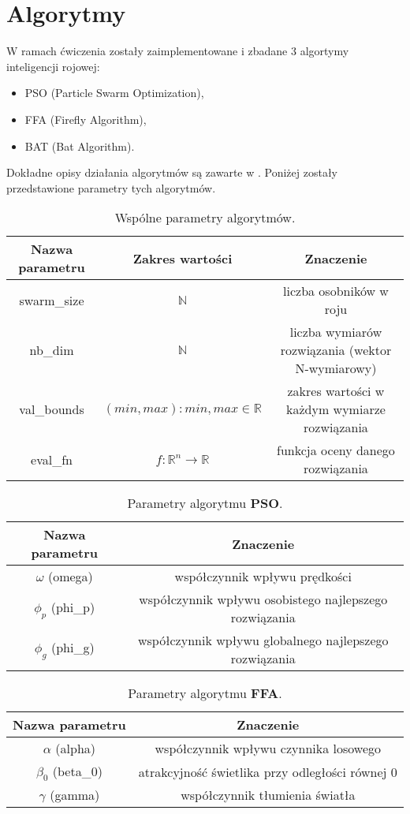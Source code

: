 \section{Algorytmy}
W ramach ćwiczenia zostały zaimplementowane i zbadane 3 algortymy inteligencji rojowej:
\begin{itemize}
  \item{PSO (Particle Swarm Optimization),}
  \item{FFA (Firefly Algorithm),}
  \item{BAT (Bat Algorithm).}
\end{itemize}
Dokładne opisy działania algorytmów są zawarte w \cite{pso, ffa, bat}. Poniżej zostały przedstawione parametry tych algorytmów.

\begin{table}[H]
  \center
  \begin{tabular}{c|c|c}
    \hline
    \textbf{Nazwa parametru} & \textbf{Zakres wartości} & \textbf{Znaczenie} \\ \hline

    swarm\_size & $\mathbb{N}$ & liczba osobników w roju \\ 
    nb\_dim      & $\mathbb{N}$ & liczba wymiarów rozwiązania (wektor N-wymiarowy) \\
    val\_bounds  & $(min, max): min, max \in \mathbb{R}$ & zakres wartości w każdym wymiarze rozwiązania \\
    eval\_fn      & $f: \mathbb{R}^n \to \mathbb{R}$ & funkcja oceny danego rozwiązania \\ \hline
  \end{tabular}
  \caption{Wspólne parametry algorytmów.}
\end{table}

\begin{table}[H]
  \center
  \begin{tabular}{c|c}
    \hline
    \textbf{Nazwa parametru} & \textbf{Znaczenie} \\ \hline
    $\omega$ (omega)  & współczynnik wpływu prędkości \\
    $\phi_p$ (phi\_p) & współczynnik wpływu osobistego najlepszego rozwiązania \\
    $\phi_g$ (phi\_g) & współczynnik wpływu globalnego najlepszego rozwiązania \\ \hline
  \end{tabular}
  \caption{Parametry algorytmu \textbf{PSO}.}
\end{table}

\begin{table}[H]
  \center
  \begin{tabular}{c|c}
    \hline
    \textbf{Nazwa parametru} & \textbf{Znaczenie} \\ \hline
    $\alpha$ (alpha)    & współczynnik wpływu czynnika losowego \\
    $\beta_0$ (beta\_0) & atrakcyjność świetlika przy odległości równej 0\\
    $\gamma$ (gamma)    & współczynnik tłumienia światła \\ \hline
  \end{tabular}
  \caption{Parametry algorytmu \textbf{FFA}.}
\end{table}

